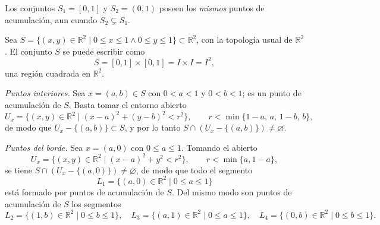 \begin{observacion}
Los conjuntos $S_1=[0,1]$ y $S_2=(0,1)$ poseen los \emph{mismos} puntos de
acumulación, aun cuando $S_2 \subsetneq S_1$.
\end{observacion}

\begin{ejemplo}
Sea $S=\{(x,y)\in\mathbb{R}^2 \mid 0\le x\le 1 \wedge 0\le y\le 1\}
\subset\mathbb{R}^2$, con la topología usual de $\mathbb{R}^2$. El conjunto
$S$ se puede escribir como
\[
S = [0,1]\times[0,1] = I\times I = I^2,
\]
una región cuadrada en $\mathbb{R}^2$.

\begin{center}
\end{center}

\emph{Puntos interiores.} Sea $x=(a,b)\in S$ con $0<a<1$ y $0<b<1$; es un
punto de acumulación de $S$. Basta tomar el entorno abierto
\[
U_x = \{(x,y)\in\mathbb{R}^2 \mid (x-a)^2+(y-b)^2<r^2\}, \qquad
r < \min\{1-a,\,a,\,1-b,\,b\},
\]
de modo que $U_x - \{(a,b)\} \subset S$, y por lo tanto
$S\cap(U_x-\{(a,b)\}) \neq \varnothing$.

\emph{Puntos del borde.} Sea $x=(a,0)$ con $0\le a\le 1$. Tomando el abierto
\[
U_x = \{(x,y)\in\mathbb{R}^2 \mid (x-a)^2+y^2<r^2\}, \qquad r<\min\{a,1-a\},
\]
se tiene $S\cap(U_x-\{(a,0)\}) \neq \varnothing$, de modo que todo el
segmento
\[
L_1 = \{(a,0)\in\mathbb{R}^2 \mid 0\le a\le 1\}
\]
está formado por puntos de acumulación de $S$. Del mismo modo son puntos
de acumulación de $S$ los segmentos
\[
L_2 = \{(1,b)\in\mathbb{R}^2 \mid 0\le b\le 1\}, \quad
L_3 = \{(a,1)\in\mathbb{R}^2 \mid 0\le a\le 1\}, \quad
L_4 = \{(0,b)\in\mathbb{R}^2 \mid 0\le b\le 1\}.
\]

\begin{center}
\end{center}
\end{ejemplo}


